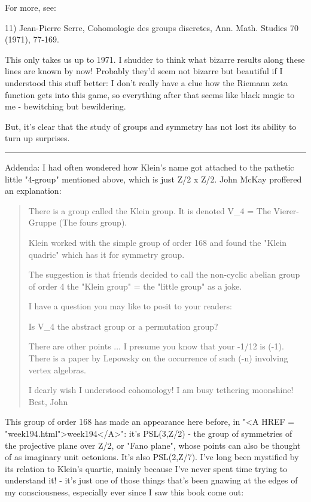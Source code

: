 For more, see:

11) Jean-Pierre Serre, Cohomologie des groups discretes, Ann. Math.
Studies 70 (1971), 77-169.

This only takes us up to 1971.  I shudder to think what bizarre 
results along these lines are known by now!  Probably they'd seem not
bizarre but beautiful if I understood this stuff better: I don't really
have a clue how the Riemann zeta function gets into this game, so 
everything after that seems like black magic to me - bewitching but
bewildering.

But, it's clear that the study of groups and symmetry has not lost its
ability to turn up surprises.

\par\noindent\rule{\textwidth}{0.4pt}
Addenda: I had often wondered how Klein's name got attached to the
pathetic little "4-group" mentioned above, which is just Z/2 x Z/2.
John McKay proffered an explanation:

\begin{quote}
 There is a group called the Klein group.
 It is denoted V_{4} = The Vierer-Gruppe  (The fours group).

 Klein worked with the simple group of order 168 and found
 the "Klein quadric" which has it for symmetry group.

 The suggestion is that friends decided to call the non-cyclic 
 abelian group of order 4 the "Klein group" = the "little group"
 as a joke.

 I have a question you may like to posit to your readers:

 Is V_{4} the abstract group or a permutation group?
 
 There are other points ... I presume you know that your
 -1/12 is \zeta (-1). There is a paper by Lepowsky on the occurrence
 of such \zeta (-n) involving vertex algebras.

 I dearly wish I understood cohomology!
 I am busy tethering moonshine!
 Best,
 John
\end{quote}

This group of order 168 has made an appearance here before, in "<A HREF
= "week194.html">week194</A>": it's PSL(3,Z/2) - the group of
symmetries of the projective plane over Z/2, or "Fano plane", whose
points can also be thought of as imaginary unit octonions.  It's also
PSL(2,Z/7).  I've long been mystified by its relation to Klein's
quartic, mainly because I've never spent time trying to understand it!
- it's just one of those things that's been gnawing at the edges of my
consciousness, especially ever since I saw this book come out:

